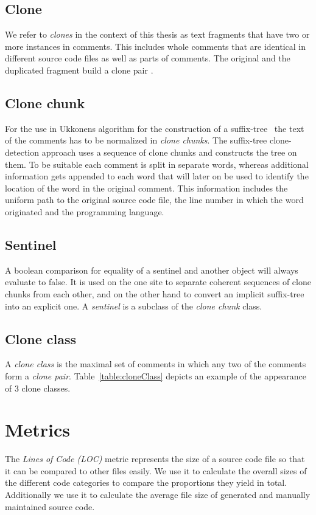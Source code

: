\subsection{Clone}
We refer to \textit{clones} in the context of this thesis as text fragments that have two or more instances in comments. This includes whole comments that are identical in different source code files as well as parts of comments. The original and the duplicated fragment build a clone pair \cite{Roy2007}. 

\subsection{Clone chunk}
For the use in Ukkonens algorithm for the construction of a suffix-tree~\cite{Ukkonen1995} the text of the comments has to be normalized in \textit{clone chunks}. The suffix-tree clone-detection approach uses a sequence of clone chunks and constructs the tree on them. To be suitable each comment is split in separate words, whereas additional information gets appended to each word that will later on be used to identify the location of the word in the original comment. This information includes the uniform path to the original source code file, the line number in which the word originated and the programming language.

\subsection{Sentinel}
\label{section:sentinel}
A boolean comparison for equality of a sentinel and another object will always evaluate to false. It is used on the one site to separate coherent sequences of clone chunks from each other, and on the other hand to convert an implicit suffix-tree into an explicit one. A \textit{sentinel} is a subclass of the \textit{clone chunk} class. 

\subsection{Clone class}
A \textit{clone class} is the maximal set of comments in which any two of the comments form a \textit{clone pair}.
Table~\ref{table:cloneClass} depicts an example of the appearance of 3
clone classes.


\section{Metrics}
The \textit{Lines of Code (LOC)} metric represents the size of a source code file so that it can be compared to other files easily. We use it to calculate the overall sizes of the different code categories to compare the proportions they yield in total. Additionally we use it to calculate the average file size of generated and manually maintained source code.

